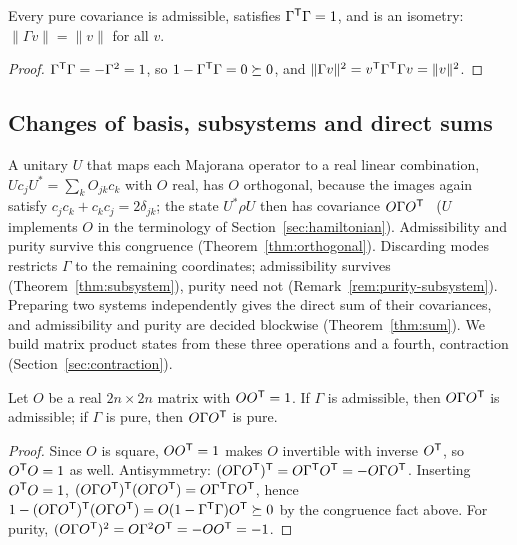 \begin{theorem}[Purity]\label{thm:purity}
Every pure covariance is admissible, satisfies $\Gamma^{\mathsf T}\Gamma=1$, and is an
isometry: $\|\Gamma v\|=\|v\|$ for all $v$.
\end{theorem}
\begin{proof}
$\Gamma^{\mathsf T}\Gamma=-\Gamma^2=1$, so $1-\Gamma^{\mathsf T}\Gamma=0\succeq0$, and
$\|\Gamma v\|^2=v^{\mathsf T}\Gamma^{\mathsf T}\Gamma v=\|v\|^2$.
\end{proof}

\subsection{Changes of basis, subsystems and direct sums}
\label{subsec:operations}
\noindent A unitary $U$ that maps each Majorana operator to a real linear combination,
$Uc_jU^*=\sum_kO_{jk}c_k$ with $O$ real, has $O$ orthogonal, because the images again
satisfy $c_jc_k+c_kc_j=2\delta_{jk}$; the state $U^*\rho U$ then has covariance
$O\Gamma O^{\mathsf T}$~\cite[Sec.~2]{bravyi} ($U$ implements $O$ in the terminology of
Section~\ref{sec:hamiltonian}). Admissibility and purity survive this congruence
(Theorem~\ref{thm:orthogonal}). Discarding modes restricts $\Gamma$ to the remaining
coordinates; admissibility survives (Theorem~\ref{thm:subsystem}), purity need not
(Remark~\ref{rem:purity-subsystem}). Preparing two systems independently gives the direct
sum of their covariances, and admissibility and purity are decided blockwise
(Theorem~\ref{thm:sum}). We build matrix product states from these three operations
and a fourth, contraction (Section~\ref{sec:contraction}).

\begin{theorem}\label{thm:orthogonal}
Let $O$ be a real $2n\times2n$ matrix with $OO^{\mathsf T}=1$. If $\Gamma$ is admissible,
then $O\Gamma O^{\mathsf T}$ is admissible; if $\Gamma$ is pure, then $O\Gamma O^{\mathsf T}$ is pure.
\end{theorem}
\begin{proof}
Since $O$ is square, $OO^{\mathsf T}=1$ makes $O$ invertible with inverse $O^{\mathsf T}$, so
$O^{\mathsf T}O=1$ as well. Antisymmetry:
$(O\Gamma O^{\mathsf T})^{\mathsf T}=O\Gamma^{\mathsf T}O^{\mathsf T}=-O\Gamma O^{\mathsf T}$. Inserting $O^{\mathsf T}O=1$,
$(O\Gamma O^{\mathsf T})^{\mathsf T}(O\Gamma O^{\mathsf T})=O\Gamma^{\mathsf T}\Gamma O^{\mathsf T}$, hence
$1-(O\Gamma O^{\mathsf T})^{\mathsf T}(O\Gamma O^{\mathsf T})=O(1-\Gamma^{\mathsf T}\Gamma)O^{\mathsf T}\succeq0$
by the congruence fact above. For purity,
$(O\Gamma O^{\mathsf T})^2=O\Gamma^2O^{\mathsf T}=-OO^{\mathsf T}=-1$.
\end{proof}


